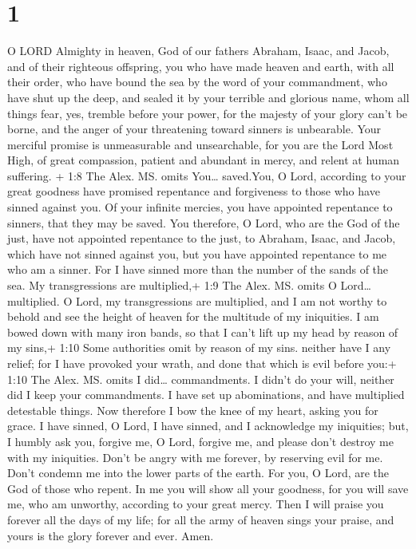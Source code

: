 \hypertarget{section}{%
\section{1}\label{section}}

 O LORD Almighty in heaven, God of our fathers Abraham,
Isaac, and Jacob, and of their righteous offspring,  you who
have made heaven and earth, with all their order,  who have
bound the sea by the word of your commandment, who have shut up the
deep, and sealed it by your terrible and glorious name, 
whom all things fear, yes, tremble before your power,  for
the majesty of your glory can't be borne, and the anger of your
threatening toward sinners is unbearable.  Your merciful
promise is unmeasurable and unsearchable,  for you are the
Lord Most High, of great compassion, patient and abundant in mercy, and
relent at human suffering.  + 1:8 The Alex. MS. omits
You\ldots{} saved.You, O Lord, according to your great goodness have
promised repentance and forgiveness to those who have sinned against
you. Of your infinite mercies, you have appointed repentance to sinners,
that they may be saved. You therefore, O Lord, who are the God of the
just, have not appointed repentance to the just, to Abraham, Isaac, and
Jacob, which have not sinned against you, but you have appointed
repentance to me who am a sinner.  For I have sinned more
than the number of the sands of the sea. My transgressions are
multiplied,+ 1:9 The Alex. MS. omits O Lord\ldots{} multiplied. O Lord,
my transgressions are multiplied, and I am not worthy to behold and see
the height of heaven for the multitude of my iniquities.  I
am bowed down with many iron bands, so that I can't lift up my head by
reason of my sins,+ 1:10 Some authorities omit by reason of my sins.
neither have I any relief; for I have provoked your wrath, and done that
which is evil before you:+ 1:10 The Alex. MS. omits I did\ldots{}
commandments. I didn't do your will, neither did I keep your
commandments. I have set up abominations, and have multiplied detestable
things.  Now therefore I bow the knee of my heart, asking
you for grace.  I have sinned, O Lord, I have sinned, and I
acknowledge my iniquities;  but, I humbly ask you, forgive
me, O Lord, forgive me, and please don't destroy me with my iniquities.
Don't be angry with me forever, by reserving evil for me. Don't condemn
me into the lower parts of the earth. For you, O Lord, are the God of
those who repent.  In me you will show all your goodness,
for you will save me, who am unworthy, according to your great mercy.
 Then I will praise you forever all the days of my life;
for all the army of heaven sings your praise, and yours is the glory
forever and ever. Amen.
